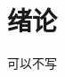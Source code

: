 \chapter{绪论}
\label{chap:introduction}

可以不写
\begin{comment}
\textcolor[RGB]{18,220,168}{AIAS编程有道}、
\textcolor[RGB]{202,12,22}{AIAS编程有道}、\textcolor[RGB]{1,8,9}{AIAS编程有道}

快速入门：本模板的意义是为了让从未接触过\LaTeX 的新手能尽快的上手，熟悉
本模板的使用。因此本文介绍的大部分内容都将以实例的形式给出，您
可以通过目录快速检索感兴趣的内容。作为一个学文论文作者，你的主
要精力应该是论文的内容而不是论文的格式。字体字号对齐方式是否有
背题图和图注是否在同一页参考文献作者是否缩写期刊名是否缩写——
这些不应该成为一个即将具有硕士学位的人花费大量精力去考虑的问题。
这也是本模板要解决的问题。
本说明的结构安排如下：第\ref{chap:introduction}章是一篇简易教程，完整的示例了论文的
一章可能会遇到的各种问题如插图、公式、图形引用、公式引用和文献
的插入及引用。第\ref{chap:figures}章是关于插图的进阶内容，会涉及到图形的不同排
列形式，图形的大小缩放等。第\ref{chap:table}章是关于表格的内容，涉及如何插入表格，
科技文献常用的三线表以及跨页长表格等问题。第\ref{chap:equ}章是关于公式的进阶内容，涉及公式
的编号、对齐、矩阵和方程组的编写等问题。第\ref{chap:bib}章是关于参考文献，
涉及文献的压缩引用，排序等。%
第\ref{chap:unit}章介绍输入数字和物理量的方法。
\end{comment}
